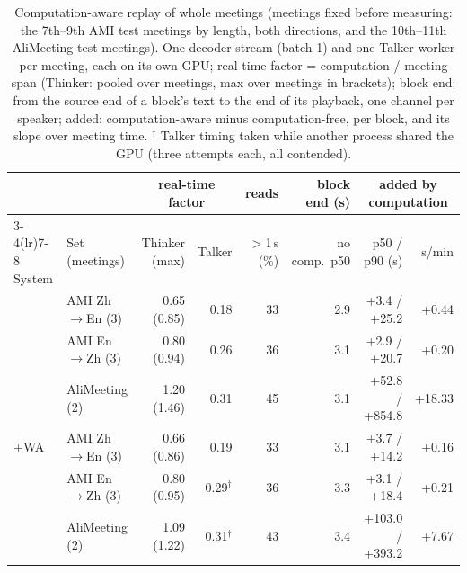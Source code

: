 \begin{table}[t]
\centering\scriptsize
\setlength{\tabcolsep}{2.5pt}
\begin{tabular}{llrrrrrr}
\toprule
 & & \multicolumn{2}{c}{real-time factor} & reads & block end (s) & \multicolumn{2}{c}{added by computation} \\
\cmidrule(lr){3-4}\cmidrule(lr){7-8}
System & Set (meetings) & Thinker (max) & Talker & $>$1\,s (\%) & no comp.\ p50 & p50 / p90 (s) & s/min \\
\midrule
\sys{} & AMI Zh$\rightarrow$En (3) & 0.65 (0.85) & 0.18 & 33 & 2.9 & +3.4 / +25.2 & +0.44 \\
 & AMI En$\rightarrow$Zh (3) & 0.80 (0.94) & 0.26 & 36 & 3.1 & +2.9 / +20.7 & +0.20 \\
 & AliMeeting (2) & 1.20 (1.46) & 0.31 & 45 & 3.1 & +52.8 / +854.8 & +18.33 \\
\midrule
\sys{}+WA & AMI Zh$\rightarrow$En (3) & 0.66 (0.86) & 0.19 & 33 & 3.1 & +3.7 / +14.2 & +0.16 \\
 & AMI En$\rightarrow$Zh (3) & 0.80 (0.95) & 0.29$^\dagger$ & 36 & 3.3 & +3.1 / +18.4 & +0.21 \\
 & AliMeeting (2) & 1.09 (1.22) & 0.31$^\dagger$ & 43 & 3.4 & +103.0 / +393.2 & +7.67 \\
\bottomrule
\end{tabular}
\caption{Computation-aware replay of whole meetings (meetings fixed before measuring: the 7th--9th AMI test meetings by length, both directions, and the 10th--11th AliMeeting test meetings). One decoder stream (batch 1) and one Talker worker per meeting, each on its own GPU; real-time factor = computation / meeting span (Thinker: pooled over meetings, max over meetings in brackets); block end: from the source end of a block's text to the end of its playback, one channel per speaker; added: computation-aware minus computation-free, per block, and its slope over meeting time. $^\dagger$ Talker timing taken while another process shared the GPU (three attempts each, all contended).}
\label{tab:wallclock}
\end{table}
